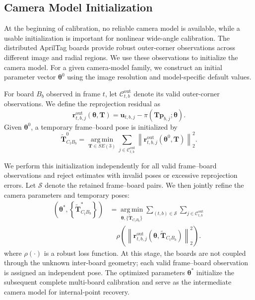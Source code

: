 \documentclass[letterpaper, 10 pt, conference]{ieeeconf}  %
\begin{document}
\subsection{Camera Model Initialization}

At the beginning of calibration, no reliable camera model is available,
while a usable initialization is important for nonlinear wide-angle
calibration. The distributed AprilTag boards provide robust outer-corner
observations across different image and radial regions. We use these
observations to initialize the camera model. For a given camera-model
family, we construct an initial parameter vector
$\boldsymbol{\theta}^{0}$ using the image resolution and model-specific
default values.

For board $B_b$ observed in frame $t$, let
$\mathcal{C}^{\mathrm{out}}_{t,b}$ denote its valid outer-corner
observations. We define the reprojection residual as
\begin{equation}
\mathbf{r}^{\mathrm{out}}_{t,b,j}
(\boldsymbol{\theta},\mathbf{T})
=
\mathbf{u}_{t,b,j}
-
\pi\!\left(
\mathbf{T}\mathbf{p}_{b,j};
\boldsymbol{\theta}
\right).
\end{equation}
Given $\boldsymbol{\theta}^{0}$, a temporary frame--board pose is
initialized by
\begin{equation}
\widetilde{\mathbf{T}}^{0}_{C_tB_b}
=
\operatorname*{arg\,min}_{\mathbf{T}\in SE(3)}
\sum_{j\in\mathcal{C}^{\mathrm{out}}_{t,b}}
\left\|
\mathbf{r}^{\mathrm{out}}_{t,b,j}
(\boldsymbol{\theta}^{0},\mathbf{T})
\right\|_2^2 .
\end{equation}

We perform this initialization independently for all valid frame--board
observations and reject estimates with invalid poses or excessive
reprojection errors. Let $\mathcal{S}$ denote the retained frame--board
pairs. We then jointly refine the camera parameters and temporary poses:
\begin{equation}
\begin{aligned}
\left(
\boldsymbol{\theta}^{*},
\left\{\widetilde{\mathbf{T}}^{*}_{C_tB_b}\right\}
\right)
&=
\operatorname*{arg\,min}_{
\boldsymbol{\theta},
\{\widetilde{\mathbf{T}}_{C_tB_b}\}}
\sum_{(t,b)\in\mathcal{S}}
\sum_{j\in\mathcal{C}^{\mathrm{out}}_{t,b}}
\\[-1pt]
&\quad
\rho\!\left(
\left\|
\mathbf{r}^{\mathrm{out}}_{t,b,j}
\left(
\boldsymbol{\theta},
\widetilde{\mathbf{T}}_{C_tB_b}
\right)
\right\|_2^2
\right).
\end{aligned}
\end{equation}
where $\rho(\cdot)$ is a robust loss function. At this stage, the boards
are not coupled through the unknown inter-board geometry; each valid
frame--board observation is assigned an independent pose. The optimized
parameters $\boldsymbol{\theta}^{*}$ initialize the subsequent complete
multi-board calibration and serve as the intermediate camera model for
internal-point recovery.
\end{document}
